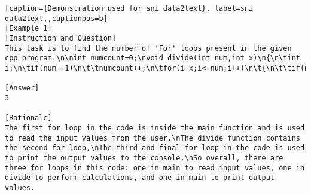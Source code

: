 \begin{lstlisting}[caption={Demonstration used for sni data2text}, label=sni data2text,,captionpos=b]
[Example 1]
[Instruction and Question]
This task is to find the number of 'For' loops present in the given cpp program.\n\nint numcount=0;\nvoid divide(int num,int x)\n{\n\tint i;\n\tif(num==1)\n\t\tnumcount++;\n\tfor(i=x;i<=num;i++)\n\t{\n\t\tif(num

[Answer]
3

[Rationale]
The first for loop in the code is inside the main function and is used to read the input values from the user.\nThe divide function contains the second for loop,\nThe third and final for loop in the code is used to print the output values to the console.\nSo overall, there are three for loops in this code: one in main to read input values, one in divide to perform calculations, and one in main to print output values.




\end{lstlisting}

